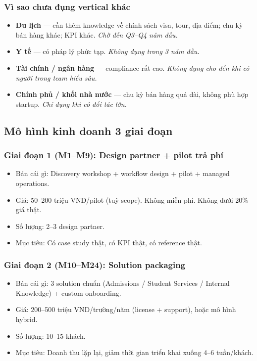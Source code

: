\documentclass[11pt,a4paper]{article}
\begin{document}
\subsubsection*{Vì sao chưa đụng vertical khác}

\begin{itemize}
\item \textbf{Du lịch} — cần thêm knowledge về chính sách visa, tour, địa điểm;
chu kỳ bán hàng khác; KPI khác. \textit{Chờ đến Q3--Q4 năm đầu.}
\item \textbf{Y tế} — có pháp lý phức tạp. \textit{Không đụng trong 3 năm đầu.}
\item \textbf{Tài chính / ngân hàng} — compliance rất cao. \textit{Không đụng cho đến khi có người trong team hiểu sâu.}
\item \textbf{Chính phủ / khối nhà nước} — chu kỳ bán hàng quá dài, không phù hợp startup. \textit{Chỉ đụng khi có đối tác lớn.}
\end{itemize}

\subsection{Mô hình kinh doanh 3 giai đoạn}

\subsubsection*{Giai đoạn 1 (M1--M9): Design partner + pilot trả phí}

\begin{itemize}
\item Bán cái gì: Discovery workshop + workflow design + pilot + managed operations.
\item Giá: 50--200 triệu VND/pilot (tuỳ scope). Không miễn phí. Không dưới 20\% giá thật.
\item Số lượng: 2--3 design partner.
\item Mục tiêu: Có case study thật, có KPI thật, có reference thật.
\end{itemize}

\subsubsection*{Giai đoạn 2 (M10--M24): Solution packaging}

\begin{itemize}
\item Bán cái gì: 3 solution chuẩn (Admissions / Student Services / Internal Knowledge) + custom onboarding.
\item Giá: 200--500 triệu VND/trường/năm (license + support), hoặc mô hình hybrid.
\item Số lượng: 10--15 khách.
\item Mục tiêu: Doanh thu lặp lại, giảm thời gian triển khai xuống 4--6 tuần/khách.
\end{itemize}
\end{document}
